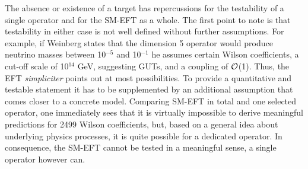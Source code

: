The absence or existence of a target has repercussions for the testability of a single operator and for the SM-EFT as a whole.
The first point to note is that testability in either case is not well defined without
further assumptions.
For example, if Weinberg states that the dimension 5 operator would produce neutrino masses
between 10$^{-5}$ and 10$^{-1}$ he assumes certain Wilson coefficients, a cut-off scale of 
10$^{14}$ GeV, suggesting GUTs, and a coupling of $\cal{O}$(1).
Thus, the EFT \textit{simpliciter} points out at most possibilities. 
To provide a quantitative
and testable statement it has to be supplemented by an additional assumption that comes
closer to a concrete model.
Comparing SM-EFT in total and one selected operator, one immediately sees that it is
virtually impossible to derive meaningful predictions for 2499 Wilson coefficients, but,
based on a general idea about underlying physics processes, it is quite possible for  a dedicated operator.
In consequence, the SM-EFT cannot be tested in a meaningful sense, a single operator however can. 
  



